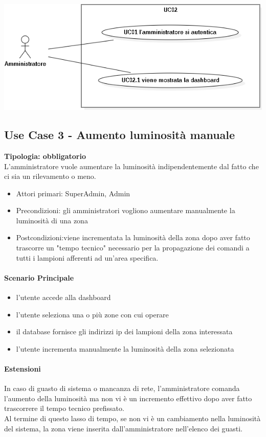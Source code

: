 \documentclass[12pt]{article}
\begin{document}
\includegraphics[scale=0.5]{UC02.png}

\subsection{Use Case 3 - Aumento luminosità manuale}
\textbf{Tipologia: obbligatorio} \\
L'amministratore vuole aumentare la luminosità indipendentemente dal fatto che ci sia un rilevamento o meno.
\begin{itemize}
	\item Attori primari: SuperAdmin, Admin
	\item Precondizioni: gli amministratori vogliono aumentare manualmente la luminosità di una zona
	\item Postcondizioni:viene incrementata la luminosità della zona dopo aver fatto trascorre un "tempo tecnico" necessario per la propagazione dei comandi a tutti i lampioni afferenti ad un'area specifica.
\end{itemize}
\paragraph{Scenario Principale}
\begin{itemize}
	\item l'utente accede alla dashboard
	\item l'utente seleziona una o più zone con cui operare
	\item il database fornisce gli indirizzi ip dei lampioni della zona interessata
	\item l'utente incrementa manualmente la luminosità della zona selezionata
\end{itemize}
\paragraph{Estensioni} In caso di guasto di sistema o mancanza di rete, l'amministratore comanda l'aumento della luminosità ma non vi è un incremento effettivo dopo aver fatto trascorrere il tempo tecnico prefissato.\\
Al termine di questo lasso di tempo, se non vi è un cambiamento nella luminosità del sistema, la zona viene inserita dall'amministratore nell'elenco dei guasti. 
\end{document}
